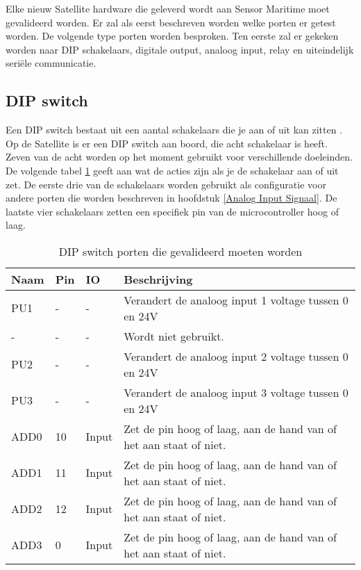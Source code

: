 Elke nieuw Satellite hardware die geleverd wordt aan Sensor Maritime moet gevalideerd worden. Er zal als eerst beschreven worden welke porten er getest worden. De volgende type porten worden besproken. Ten eerste zal er gekeken worden naar DIP schakelaars, digitale output, analoog input, relay en uiteindelijk seriële communicatie.

\subsection{DIP switch}
Een DIP switch bestaat uit een aantal schakelaars die je aan of uit kan zitten \autocite{DIP}. Op de Satellite is er een DIP switch aan boord, die acht schakelaar is heeft. Zeven van de acht worden op het moment gebruikt voor verschillende doeleinden. De volgende tabel \ref{tab:hw_val_dip} geeft aan wat de acties zijn als je de schakelaar aan of uit zet. De eerste drie van de schakelaars worden gebruikt als configuratie voor andere porten die worden beschreven in hoofdstuk \ref{Analog Input Signaal}. De laatste vier schakelaars zetten een specifiek pin van de microcontroller hoog of laag.
\begin{table}[h!]
	\caption{DIP switch porten die gevalideerd moeten worden}
	\begin{tabular}{lllp{12cm}}
	\toprule
	\textbf{Naam} & \textbf{Pin} & \textbf{IO} & \textbf{Beschrijving}	\\ \toprule
	PU1		& - 	& -    		& Verandert de analoog input 1 voltage tussen 0 en 24V	\\
	-		& - 	& -    		& Wordt niet gebruikt.								\\
	PU2		& - 	& -    		& Verandert de analoog input 2 voltage tussen 0 en 24V	\\
	PU3		& - 	& -    		& Verandert de analoog input 3 voltage tussen 0 en 24V	\\
	ADD0 	& 10	& Input		& Zet de pin hoog of laag, aan de hand van of het aan staat of niet.		\\
	ADD1 	& 11	& Input		& Zet de pin hoog of laag, aan de hand van of het aan staat of niet.		\\
	ADD2 	& 12	& Input		& Zet de pin hoog of laag, aan de hand van of het aan staat of niet.		\\
	ADD3 	& 0 	& Input		& Zet de pin hoog of laag, aan de hand van of het aan staat of niet.		\\ \bottomrule
	\end{tabular}
	\label{tab:hw_val_dip}
\end{table}


